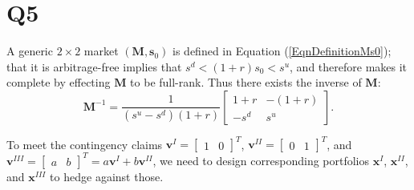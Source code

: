 \documentclass[final,3p,times]{elsarticle}
\begin{document}
\section{Q5}
	A generic $2\times2$ market $\left(\mathbf{M},\mathbf{s}_0\right)$ is defined in Equation (\ref{EqnDefinitionMs0}); that it is arbitrage-free implies that $s^d<\left(1+r\right)s_0<s^u$, and therefore makes it complete by effecting $\mathbf{M}$ to be full-rank. Thus there exists the inverse of $\mathbf{M}$:
	\begin{equation}
		\mathbf{M}^{-1}=\frac{1}{\left(s^u-s^d\right)\left(1+r\right)}
		\begin{bmatrix} 1+r & -\left(1+r\right) \\ -s^d & s^u \end{bmatrix}
		.
	\end{equation}
	
	To meet the contingency claims $\mathbf{v}^{I}=\begin{bmatrix} 1 & 0\end{bmatrix}^T$, $\mathbf{v}^{II}=\begin{bmatrix} 0 & 1\end{bmatrix}^T$, and $\mathbf{v}^{III}=\begin{bmatrix} a & b \end{bmatrix}^T=a\mathbf{v}^{I}+b\mathbf{v}^{II}$, we need to design corresponding portfolios $\mathbf{x}^{I}$, $\mathbf{x}^{II}$, and $\mathbf{x}^{III}$ to hedge against those.
	
\end{document}
